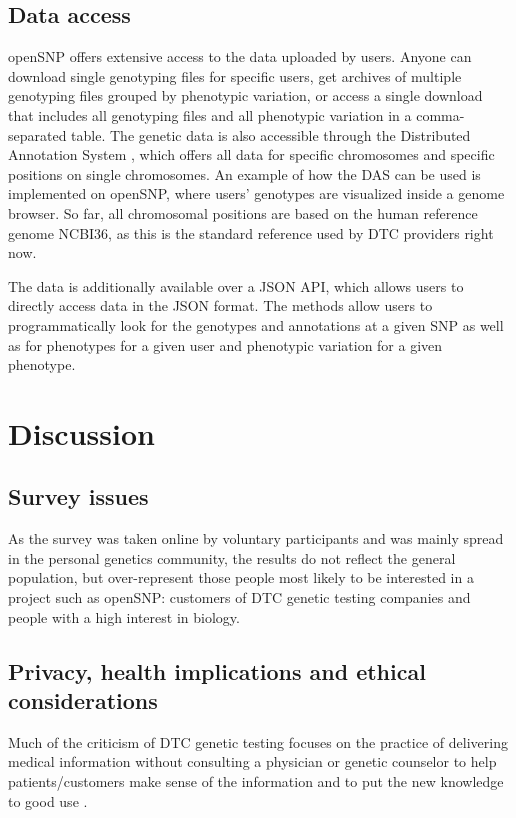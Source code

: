 \documentclass[10pt]{article}
\begin{document}
\subsection*{Data access}
openSNP offers extensive access to the data uploaded by users. Anyone can download single genotyping files for specific users, get archives of multiple genotyping files 
grouped by phenotypic variation, or access a single download that includes all genotyping files and all phenotypic variation in a comma-separated table. The genetic data is also 
accessible through the Distributed Annotation System \cite{Dowell2001,Jenkinson2008}, which offers all data for specific chromosomes and specific positions on single chromosomes. 
An example of how the DAS can be used is implemented on openSNP, where users' genotypes are visualized inside a genome browser. So far, all chromosomal positions are based on the human reference genome NCBI36, as this is the standard reference used by DTC providers right now.

The data is additionally available over a JSON API, which allows users to directly access data in the JSON format. The methods allow users to programmatically look for the genotypes and annotations at a given SNP as well as for phenotypes for a given user and phenotypic variation for a given phenotype.

\section*{Discussion}

\subsection*{Survey issues}

As the survey was taken online by voluntary participants and was mainly spread in the personal genetics community, the results do not reflect the general population, but over-represent those people most likely to be interested in a project such as openSNP: customers of DTC genetic testing companies and people with a high interest in biology. 


\subsection*{Privacy, health implications and ethical considerations}

Much of the criticism of DTC genetic testing focuses on the practice 
of delivering medical information without consulting a physician or genetic counselor to help patients/customers make sense of the information 
and to put the new knowledge to good use \cite{Hauskeller2011,Hogarth2008,Wasson2009}.  
\end{document}
